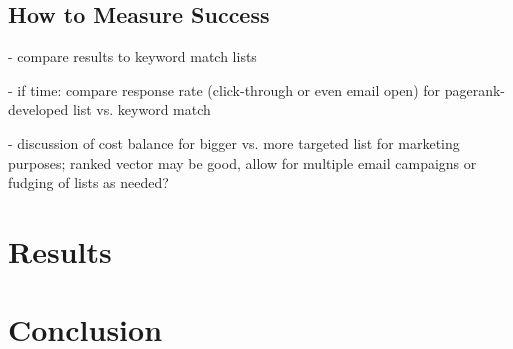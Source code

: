 \documentclass[]{report}   %
\begin{document}
\section{How to Measure Success}

- compare results to keyword match lists

- if time: compare response rate (click-through or even email open) for pagerank-developed list vs. keyword match

- discussion of cost balance for bigger vs. more targeted list for marketing purposes; ranked vector may be good, allow for multiple email campaigns or fudging of lists as needed?

\chapter{Results}
\chapter{Conclusion}        

\appendix
\appendixpage
\addappheadtotoc
\end{document}
